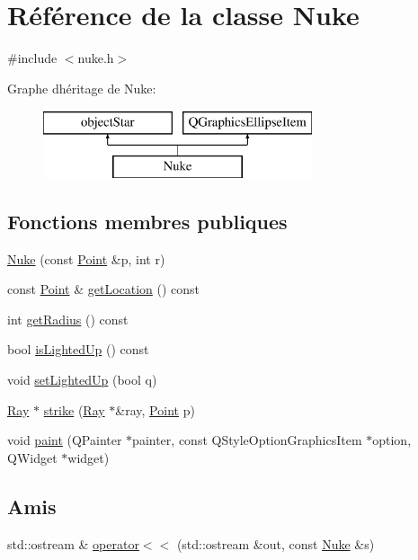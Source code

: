 \hypertarget{class_nuke}{}\section{Référence de la classe Nuke}
\label{class_nuke}


{\ttfamily \#include $<$nuke.\+h$>$}

Graphe d\textquotesingle{}héritage de Nuke\+:\begin{figure}[H]
\begin{center}
\leavevmode
\includegraphics[height=2.000000cm]{class_nuke}
\end{center}
\end{figure}
\subsection*{Fonctions membres publiques}
\begin{DoxyCompactItemize}
\item 
\mbox{\hyperlink{class_nuke_aa45d3d8dc6e8a71a48f76a8d9fba046f}{Nuke}} (const \mbox{\hyperlink{class_point}{Point}} \&p, int r)
\item 
const \mbox{\hyperlink{class_point}{Point}} \& \mbox{\hyperlink{class_nuke_a5f32834b745ecf0b58197928af2053f6}{get\+Location}} () const
\item 
int \mbox{\hyperlink{class_nuke_ab04e87e07148c5f30f2e85af298baea2}{get\+Radius}} () const
\item 
bool \mbox{\hyperlink{class_nuke_a4ebcb9af0b1cb82d707e0e2103f989cd}{is\+Lighted\+Up}} () const
\item 
void \mbox{\hyperlink{class_nuke_a500330e76ec276823c1f758db82e59c6}{set\+Lighted\+Up}} (bool q)
\item 
\mbox{\hyperlink{class_ray}{Ray}} $\ast$ \mbox{\hyperlink{class_nuke_aa5b008c32d4189d23695c5e2652e1e30}{strike}} (\mbox{\hyperlink{class_ray}{Ray}} $\ast$\&ray, \mbox{\hyperlink{class_point}{Point}} p)
\item 
void \mbox{\hyperlink{class_nuke_a10ed7d69df10cde51b39420943baad83}{paint}} (Q\+Painter $\ast$painter, const Q\+Style\+Option\+Graphics\+Item $\ast$option, Q\+Widget $\ast$widget)
\end{DoxyCompactItemize}
\subsection*{Amis}
\begin{DoxyCompactItemize}
\item 
std\+::ostream \& \mbox{\hyperlink{class_nuke_a9de8a2a72db7974fd22deac7ea5728a4}{operator$<$$<$}} (std\+::ostream \&out, const \mbox{\hyperlink{class_nuke}{Nuke}} \&s)
\end{DoxyCompactItemize}


